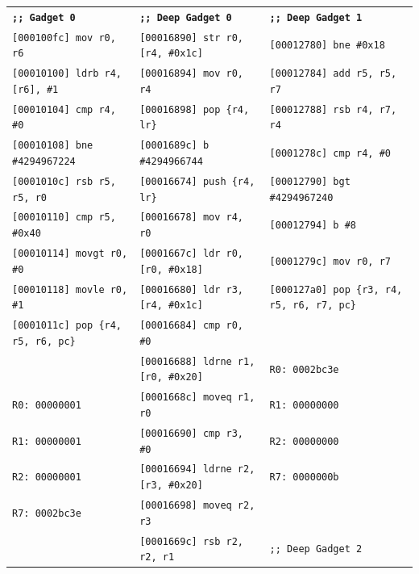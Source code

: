 \documentclass[9pt]{beamer}
\begin{document}
\begin{frame}{} %
\begin{center}
  
    {\tiny
      \begin{tabular}{l l l} \hline
        \textbf{\texttt{;; Gadget 0}} 			& \textbf{\texttt{;; Deep Gadget 0}}				& \textbf{\texttt{;; Deep Gadget 1}} \\ 
        \texttt{[000100fc]  mov r0, r6} 	& \texttt{[00016890]  str r0, [r4, \#0x1c]}		& \texttt{[00012780]  bne \#0x18} \\
        \texttt{[00010100]  ldrb r4, [r6], \#1} & \texttt{[00016894]  mov r0, r4}		& \texttt{[00012784]  add r5, r5, r7} \\
        \texttt{[00010104]  cmp r4, \#0}	& \texttt{[00016898]  pop \{r4, lr\}}			& \texttt{[00012788]  rsb r4, r7, r4} \\
        \texttt{[00010108]  bne \#4294967224} & \texttt{[0001689c]  b \#4294966744}	& \texttt{[0001278c]  cmp r4, \#0} \\
        \texttt{[0001010c]  rsb r5, r5, r0}	& \texttt{[00016674]  push \{r4, lr\}}		& \texttt{[00012790]  bgt \#4294967240} \\
        \texttt{[00010110]  cmp r5, \#0x40} & \texttt{[00016678]  mov r4, r0}		& \texttt{[00012794]  b \#8} \\
        \texttt{[00010114]  movgt r0, \#0}	& \texttt{[0001667c]  ldr r0, [r0, \#0x18]}	& \texttt{[0001279c]  mov r0, r7} \\
        \texttt{[00010118]  movle r0, \#1}	& \texttt{[00016680]  ldr r3, [r4, \#0x1c]}	& \texttt{[000127a0]  pop \{r3, r4, r5, r6, r7, pc\}} \\
        \texttt{[0001011c]  pop \{r4, r5, r6, pc\}} & \texttt{[00016684]  cmp r0, \#0}		& \\
 				& \texttt{[00016688]  ldrne r1, [r0, \#0x20]}	& \texttt{R0: 0002bc3e} \\
        \texttt{R0: 00000001} 			& \texttt{[0001668c]  moveq r1, r0}		& \texttt{R1: 00000000} \\
        \texttt{R1: 00000001} 			& \texttt{[00016690]  cmp r3, \#0}		& \texttt{R2: 00000000} \\
        \texttt{R2: 00000001} 			& \texttt{[00016694]  ldrne r2, [r3, \#0x20]}	& \texttt{R7: 0000000b} \\
        \texttt{R7: 0002bc3e} 			& \texttt{[00016698]  moveq r2, r3}		& \\
        & \texttt{[0001669c]  rsb r2, r2, r1}		& \texttt{;; Deep Gadget 2} \\

\end{tabular}}
\end{center}
\end{frame}
\end{document}
